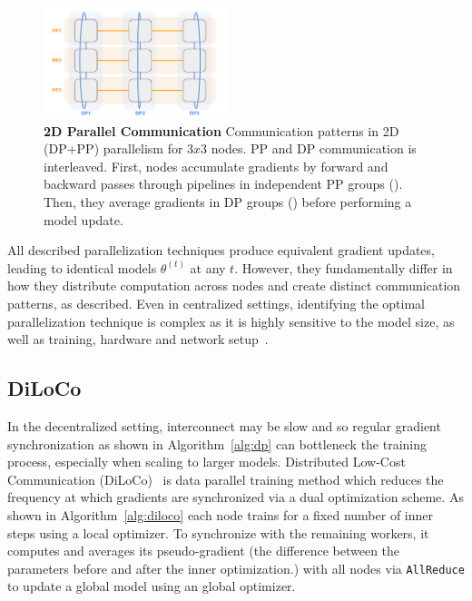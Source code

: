 \documentclass{article}
\newcommand{\orangebox}{\tcbox[size=minimal,boxrule=0pt,arc=3pt,
  colback=oorange!50,colframe=oorange!50,left=1pt,right=1pt,top=1pt,bottom=1pt]{\phantom{x}}}
\newcommand{\bluebox}{\tcbox[size=minimal,boxrule=0pt,arc=3pt,
  colback=bblue!50,colframe=bblue!50,left=1pt,right=1pt,top=1pt,bottom=1pt]{\phantom{x}}}
\begin{document}
\begin{figure}[ht]
    \centering
    \includegraphics[width=0.48\textwidth]{figures/dp-pp.png}
    \caption{\textbf{2D Parallel Communication} Communication patterns in 2D
    (DP+PP) parallelism for $3x3$ nodes. PP and DP communication is interleaved.
    First, nodes accumulate gradients by forward and backward passes through
    pipelines in independent PP groups (\mbox{\orangebox}). Then,
    they average gradients in DP groups (\mbox{\bluebox}) before
    performing a model update.  }
    \label{fig:dp-pp}
\end{figure}

All described parallelization techniques produce equivalent gradient updates,
leading to identical models $\theta^{(t)}$ at any $t$. However, they
fundamentally differ in how they distribute computation across nodes and create
distinct communication patterns, as described. Even in centralized settings,
identifying the optimal parallelization technique is complex as it is highly
sensitive to the model size, as well as training, hardware and network
setup~\cite{hagemann2024parallelization, fernandez2024scalingtrends}.

\subsection{DiLoCo}

In the decentralized setting, interconnect may be slow and so regular gradient
synchronization as shown in Algorithm~\ref{alg:dp} can bottleneck the training
process, especially when scaling to larger models. Distributed Low-Cost
Communication (DiLoCo)~\cite{douillard2023diloco} is data parallel training method
which reduces the frequency at which gradients are synchronized via a dual
optimization scheme. As shown in Algorithm~\ref{alg:diloco} each node trains for
a fixed number of inner steps using a local optimizer. To synchronize with the
remaining workers, it computes and averages its pseudo-gradient (the difference
between the parameters before and after the inner optimization.) with all nodes
via \texttt{AllReduce} to update a global model using an global optimizer. 
\end{document}
